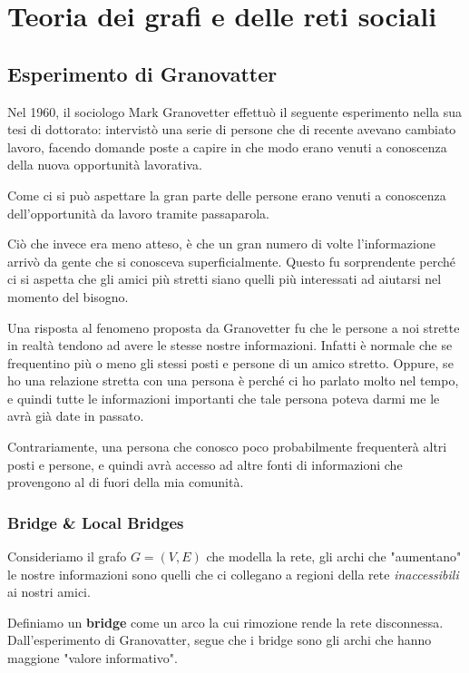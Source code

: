 \chapter{Teoria dei grafi e delle reti sociali}

\section{Esperimento di Granovatter}

Nel 1960, il sociologo Mark Granovetter effettuò il seguente esperimento nella sua tesi di dottorato: intervistò una serie di persone che di recente avevano cambiato lavoro, facendo domande poste a capire in che modo erano venuti a conoscenza della nuova opportunità lavorativa.

Come ci si può aspettare la gran parte delle persone erano venuti a conoscenza dell'opportunità da lavoro tramite passaparola.

Ciò che invece era meno atteso, è che un gran numero di volte l'informazione arrivò da gente che si conosceva superficialmente.
Questo fu sorprendente perché ci si aspetta che gli amici più stretti siano quelli più interessati ad aiutarsi nel momento del bisogno.

Una risposta al fenomeno proposta da Granovetter fu che le persone a noi strette in realtà tendono ad avere le stesse nostre informazioni.
Infatti è normale che se frequentino più o meno gli stessi posti e persone di un amico stretto.
Oppure, se ho una relazione stretta con una persona è perché ci ho parlato molto nel tempo, e quindi tutte le informazioni importanti che tale persona poteva darmi me le avrà già date in passato.

Contrariamente, una persona che conosco poco probabilmente frequenterà altri posti e persone, e quindi avrà accesso ad altre fonti di informazioni che provengono al di fuori della mia comunità.

\subsection{Bridge \& Local Bridges}

Consideriamo il grafo $G = (V, E)$ che modella la rete, gli archi che "aumentano" le nostre informazioni sono quelli che ci collegano a regioni della rete \textit{inaccessibili} ai nostri amici.

\begin{definizione}[Bridge]
    Definiamo un \textbf{bridge} come un arco la cui rimozione rende la rete disconnessa. Dall'esperimento di Granovatter, segue che i bridge sono gli archi che hanno maggione "valore informativo".
\end{definizione}

